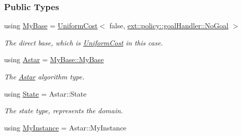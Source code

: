 \subsubsection*{Public Types}
\begin{DoxyCompactItemize}
\item 
using \hyperlink{structslb_1_1ext_1_1algorithm_1_1SimpleUniformCost_a63c1dba6a5c187cae9b8c3ade9a29b14}{My\+Base} = \hyperlink{structslb_1_1ext_1_1algorithm_1_1UniformCost}{Uniform\+Cost}$<$ false, \hyperlink{structslb_1_1ext_1_1policy_1_1goalHandler_1_1NoGoal}{ext\+::policy\+::goal\+Handler\+::\+No\+Goal} $>$\hypertarget{structslb_1_1ext_1_1algorithm_1_1SimpleUniformCost_a63c1dba6a5c187cae9b8c3ade9a29b14}{}\label{structslb_1_1ext_1_1algorithm_1_1SimpleUniformCost_a63c1dba6a5c187cae9b8c3ade9a29b14}

\begin{DoxyCompactList}\small\item\em The direct base, which is \hyperlink{structslb_1_1ext_1_1algorithm_1_1UniformCost}{Uniform\+Cost} in this case. \end{DoxyCompactList}\item 
using \hyperlink{structslb_1_1ext_1_1algorithm_1_1SimpleUniformCost_a8c6d44f70577ae4a76cb3c557379cd8b}{Astar} = \hyperlink{structslb_1_1ext_1_1algorithm_1_1UniformCost_a5c5ed4ddf95cdeb811d15eb47f05bec3}{My\+Base\+::\+My\+Base}\hypertarget{structslb_1_1ext_1_1algorithm_1_1SimpleUniformCost_a8c6d44f70577ae4a76cb3c557379cd8b}{}\label{structslb_1_1ext_1_1algorithm_1_1SimpleUniformCost_a8c6d44f70577ae4a76cb3c557379cd8b}

\begin{DoxyCompactList}\small\item\em The \hyperlink{structslb_1_1ext_1_1algorithm_1_1Astar}{Astar} algorithm type. \end{DoxyCompactList}\item 
using \hyperlink{structslb_1_1ext_1_1algorithm_1_1SimpleUniformCost_ab7ba38c5015e84272df2f291b18a5b6a}{State} = Astar\+::\+State\hypertarget{structslb_1_1ext_1_1algorithm_1_1SimpleUniformCost_ab7ba38c5015e84272df2f291b18a5b6a}{}\label{structslb_1_1ext_1_1algorithm_1_1SimpleUniformCost_ab7ba38c5015e84272df2f291b18a5b6a}

\begin{DoxyCompactList}\small\item\em The state type, represents the domain. \end{DoxyCompactList}\item 
using \hyperlink{structslb_1_1ext_1_1algorithm_1_1SimpleUniformCost_a933ddf8a5250e4edd79707952a011777}{My\+Instance} = Astar\+::\+My\+Instance\hypertarget{structslb_1_1ext_1_1algorithm_1_1SimpleUniformCost_a933ddf8a5250e4edd79707952a011777}{}\label{structslb_1_1ext_1_1algorithm_1_1SimpleUniformCost_a933ddf8a5250e4edd79707952a011777}


\end{DoxyCompactItemize}
